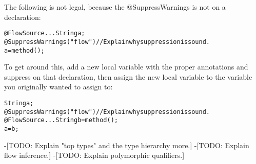 \begin{itemize}
 The following is not legal, because the @SuppressWarnings is not on a
 declaration:

\begin{alltt}
	@FlowSource... String a; 
	@SuppressWarnings("flow") // Explain why suppression is sound.
	a = method();
\end{alltt}

 To get around this, add a new local variable with the proper
 annotations and suppress on that declaration, then assign the new local
 variable to the variable you originally wanted to assign to:

\begin{alltt}
	String a;
	@SuppressWarnings("flow") // Explain why suppression is sound.
	@FlowSource... String b = method();
	a = b;
\end{alltt}

\end{itemize}

-[TODO: Explain "top types" and the type hierarchy more.]
-[TODO: Explain flow inference.]
-[TODO: Explain polymorphic qualifiers.]
